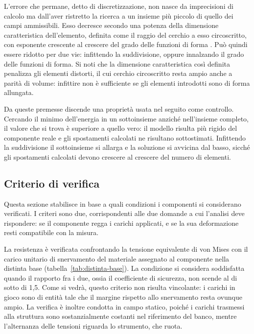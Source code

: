 L'errore che permane, detto di discretizzazione, non nasce da imprecisioni di
calcolo ma dall'aver ristretto la ricerca a un insieme più piccolo di quello dei
campi ammissibili. Esso decresce secondo una potenza della dimensione
caratteristica dell'elemento, definita come il raggio del cerchio a esso
circoscritto, con esponente crescente al crescere del grado delle funzioni di
forma \cite[cap.~11]{santi2024}. Può quindi essere ridotto per due vie: infittendo
la suddivisione, oppure innalzando il grado delle funzioni di forma. Si noti che
la dimensione caratteristica così definita penalizza gli elementi distorti, il
cui cerchio circoscritto resta ampio anche a parità di volume: infittire non è
sufficiente se gli elementi introdotti sono di forma allungata.

Da queste premesse discende una proprietà usata nel seguito come controllo.
Cercando il minimo dell'energia in un sottoinsieme anziché nell'insieme
completo, il valore che si trova è superiore a quello vero: il modello risulta
più rigido del componente reale e gli spostamenti calcolati ne risultano
sottostimati. Infittendo la suddivisione il sottoinsieme si allarga e la
soluzione si avvicina dal basso, sicché gli spostamenti calcolati devono
crescere al crescere del numero di elementi.

\subsection{Criterio di verifica}
\label{sec:fem-criterio}

Questa sezione stabilisce in base a quali condizioni i componenti si considerano
verificati. I criteri sono due, corrispondenti alle due domande a cui l'analisi
deve rispondere: se il componente regga i carichi applicati, e se la sua
deformazione resti compatibile con la misura.

La resistenza è verificata confrontando la tensione equivalente di von Mises con
il carico unitario di snervamento del materiale assegnato al componente nella
distinta base (tabella~\ref{tab:distinta-base}). La condizione si considera
soddisfatta quando il rapporto fra i due, ossia il coefficiente di sicurezza,
non scende al di sotto di 1,5.
Come si vedrà, questo criterio non risulta vincolante: i carichi in gioco sono di
entità tale che il margine rispetto allo snervamento resta ovunque ampio. La
verifica è inoltre condotta in campo statico, poiché i carichi trasmessi alla
struttura sono sostanzialmente costanti nel riferimento del banco, mentre
l'alternanza delle tensioni riguarda lo strumento, che ruota.

